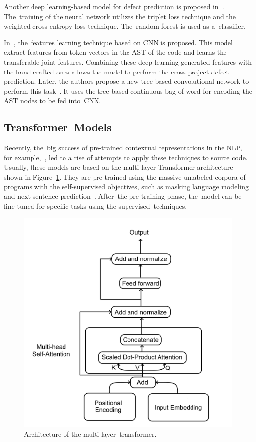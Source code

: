 \documentclass[mathematics,review,accept,moreauthors,pdftex]{Definitions/mdpi}
\begin{document}
Another deep learning-based model for defect prediction is proposed in~\cite{XuEtAl2019}. The~training of the neural network utilizes the triplet loss technique and the weighted cross-entropy loss technique. The~random forest is used as a~classifier.

In~\cite{QiuLuCaiJiang2019}, the~features learning technique based on CNN is proposed. This model extract features from token vectors in the AST of the code and learns the transferable joint features. Combining these deep-learning-generated features with the hand-crafted ones allows the model to perform the cross-project defect prediction. Later, the authors propose a new tree-based convolutional network to perform this task~\cite{CaiLuQiu2019}. It uses the tree-based continuous bag-of-word for encoding the AST nodes to be fed into~CNN.

\subsection{Transformer~Models}

Recently, the~big success of pre-trained contextual representations in the NLP, for example,~\cite{liu2019roberta}, led to a rise of attempts to apply these techniques to source code. Usually, these models are based on the multi-layer Transformer architecture~\cite{vaswani2017attention} shown in \mbox{Figure~\ref{fig5}}. They are pre-trained using the massive unlabeled corpora of programs with the self-supervised objectives, such as masking language modeling and next sentence \mbox{prediction~\cite{KanadeEtAl2019,FengEtAl2020}}. After~the pre-training phase, the~model can be fine-tuned for specific tasks using the supervised~techniques.

\begin{figure}[H] %
\includegraphics[width=10.5 cm]{f5.png}
\caption{Architecture of the multi-layer~transformer.}
\label{fig5} %
\end{figure}
\end{document}

